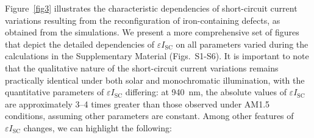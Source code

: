 \documentclass[a4paper,fleqn]{cas-sc}
\begin{document}
Figure~\ref{fig3} illustrates the characteristic dependencies of short-circuit current variations resulting
from the reconfiguration of iron-containing defects, as obtained from the simulations.
We present a more comprehensive set of figures that depict the detailed dependencies of $\varepsilon I_\mathrm{SC}$ on
all parameters varied during the calculations in the Supplementary Material (Figs.~S1-S6).
It is important to note that the qualitative nature of the short-circuit current variations remains practically identical
under both solar and monochromatic illumination, with the quantitative parameters of $\varepsilon I_\mathrm{SC}$ differing:
at 940~nm, the absolute values of $\varepsilon I_\mathrm{SC}$ are approximately 3--4 times greater than those observed under AM1.5 conditions,
assuming other parameters are constant.
Among other features of $\varepsilon I_\mathrm{SC}$ changes, we can highlight the following:
\end{document}

